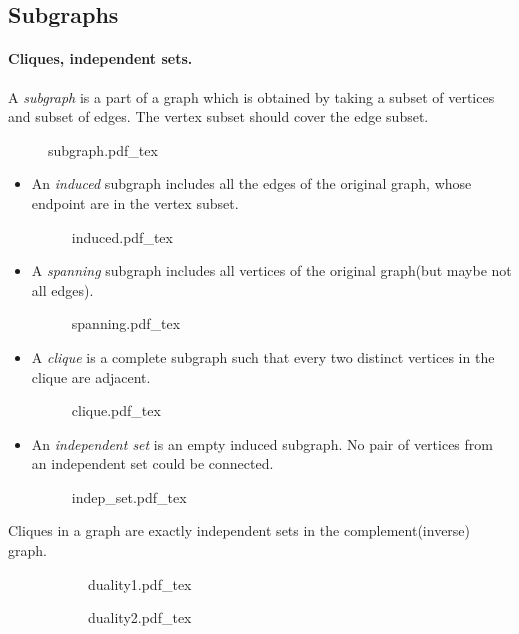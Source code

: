 \documentclass{article}
\newcommand{\incfig}[2][1]{%
    \def\svgwidth{#1\columnwidth}
    {#2.pdf_tex}
}
\begin{document}
\subsection{Subgraphs}

\paragraph{Cliques, independent sets.}
A {\it subgraph} is a part of a graph which is obtained by taking a subset of vertices and subset of edges. The vertex subset should cover the edge subset.
\begin{figure}[h!]
  \centering
  \incfig{subgraph}
\end{figure}
\begin{itemize}
  \item An {\it induced} subgraph includes all the edges of the original graph, whose endpoint are in the vertex subset.
  \begin{figure}[h!]
    \centering
    \incfig{induced}
  \end{figure}

  \newpage

  \item A {\it spanning} subgraph includes all vertices of the original graph(but maybe not all edges).
  \begin{figure}[h!]
    \centering
    \incfig{spanning}
  \end{figure}

  \item A {\it clique} is a complete subgraph such that every two distinct vertices in the clique are adjacent.
  \begin{figure}[h!]
    \centering
    \incfig{clique}
  \end{figure}

  \newpage

  \item An {\it independent set} is an empty induced subgraph. No pair of vertices from an independent set could be connected.
  \begin{figure}[h!]
    \centering
    \incfig{indep_set}
  \end{figure}
\end{itemize}
Cliques in a graph are exactly independent sets in the complement(inverse) graph.
\begin{figure}[h!]
  \centering
  \begin{subfigure}[b]{0.49\linewidth}
    \incfig{duality1}
  \end{subfigure}
  \begin{subfigure}[b]{0.49\linewidth}
    \incfig{duality2}
  \end{subfigure}
\end{figure}
\end{document}
